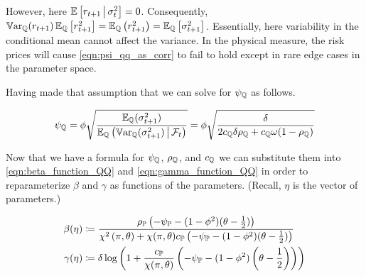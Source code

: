 \documentclass[11pt, letterpaper, twoside, final]{article}
\begin{document}

However, here $\operatorname{\mathbb{E}}\left[r_{t+1} \,\middle\vert\, \sigma^2_{t}\right] = 0$.
Consequently, $\operatorname{\mathbb{V}ar}_{\mathbb{Q}}(r_{t+1}) \operatorname{\mathbb{E}}_{\mathbb{Q}}\left[r_{t+1}^2\right]  = \operatorname{\mathbb{E}}_{\mathbb{Q}}\left(r^2_{t+1}\right) =
\operatorname{\mathbb{E}}_{\mathbb{Q}}\left[\sigma^2_{t+1}\right]$.
Essentially, here variability in the conditional mean cannot affect the variance.
In the physical measure, the risk prices will cause  \cref{eqn:psi_qq_as_corr} to fail to hold except in rare edge
cases in the parameter space.


Having made that assumption that we can solve for $\psi_{\mathbb{Q}}$ as follows.

\begin{equation}
    \psi_{\mathbb{Q}} =  \phi \sqrt{\frac{\operatorname{\mathbb{E}}_{\mathbb{Q}}(\sigma^2_{t+1})}{\operatorname{\mathbb{E}}_{\mathbb{Q}}\left(\operatorname{\mathbb{V}ar}_{\mathbb{Q}}(\sigma^2_{t+1}) \,\middle\vert\, \mathcal{F}_t
    \right)}}
    = \phi \sqrt{\frac{\delta}{2 c_{\mathbb{Q}} \delta \rho_{\mathbb{Q}} + c_{\mathbb{Q}} \omega (1 - \rho_{\mathbb{Q}})}}
    \label{eqn:psi_function}
\end{equation}

Now that we have a formula for $\psi_{\mathbb{Q}}$, $\rho_{\mathbb{Q}}$, and $c_{\mathbb{Q}}$ we can substitute them into
\cref{eqn:beta_function_QQ}  and \cref{eqn:gamma_function_QQ} in order to reparameterize $\beta$ and $\gamma$ as
functions of the parameters.
(Recall, $\eta$ is the vector of parameters.)

\begin{align}
    \label{eqn:beta_function}
    \beta(\eta) &\coloneqq \frac{\rho_{\PP} \left(-\psi_{\PP} - (1- \phi^2)(\theta -
    \frac{1}{2})\right)}{\chi^2\left(\pi, \theta\right) + \chi(\pi, \theta)c_{\PP} \left(-\psi_{\PP} - (1-
    \phi^2)(\theta-\frac{1}{2} )\right)}  \\
%
    \label{eqn:gamma_function}
    \gamma(\eta) &\coloneqq \delta \log\left(1 + \frac{c_{\PP}}{\chi(\pi,\theta)} \left(-\psi_{\PP} - (1-
    \phi^2)\left(\theta - \frac{1}{2}\right) \right)\right)
\end{align}
\end{document}

